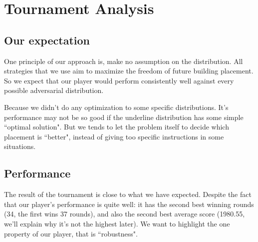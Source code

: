 \section{Tournament Analysis}

\subsection{Our expectation}
One principle of our approach is, make no assumption on the distribution.
All strategies that we use aim to maximize the freedom of future building placement.
So we expect that our player would perform consistently well against every possible adversarial distribution.

Because we didn't do any optimization to some specific distributions. It's performance may not be so good if
the underline distribution has some simple ``optimal solution". But we tends to let the problem itself to decide
which placement is ``better", instead of giving too specific instructions in some situations.

\subsection{Performance}

The result of the tournament is close to what we have expected.
Despite the fact that our player's performance is quite well: it has the second best winning rounds (34, the
first wins 37 rounds), and also the second best average score (1980.55, we'll explain why it's not the highest later).
We want to highlight the one property of our player, that is ``robustness".


